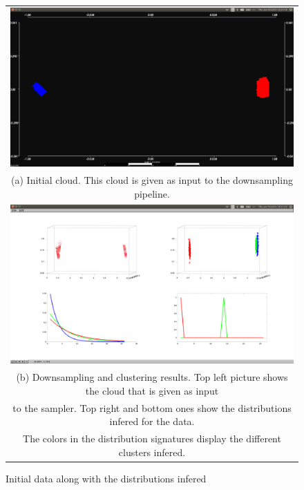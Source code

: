 \documentclass[twoside,hidelinks]{article}
\begin{document}
\begin{figure}
\begin{tabular}{c}
  \includegraphics[width=1\textwidth]{clusterings/initialData} \\
  (a) Initial cloud. This cloud is given as input to the downsampling pipeline.  \\
   \includegraphics[width=1\textwidth]{clusterings/colorcodedDistributions} \\
 (b) Downsampling and clustering results. Top left picture shows the cloud that is given as input\\
 to the sampler. Top right and bottom ones show the distributions infered for the data. \\
 The colors in the distribution signatures display the different clusters infered.\end{tabular}
\caption{Initial data along with the distributions infered }
  \label{pcl:clust}
\end{figure}
\end{document}
